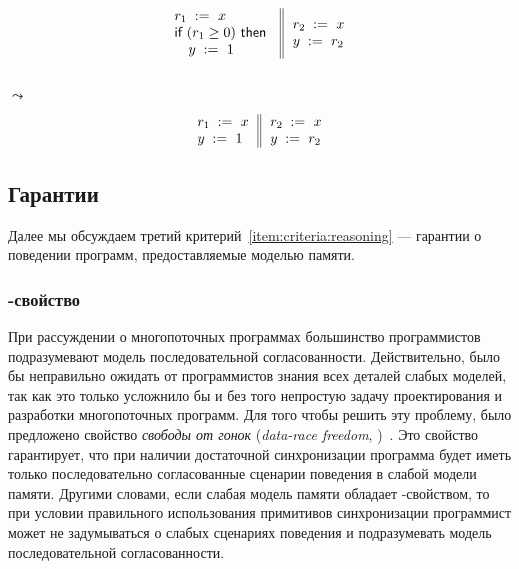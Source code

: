 {\footnotesize
\begin{minipage}{0.45\linewidth}
\begin{equation*}
\inarrII{
   \readInst{}{r_1}{x}             \\
   \kw{if} (r_1 \geq 0) ~\kw{then} \\
   \quad\writeInst{}{y}{1}         \\
}{
  \readInst{}{r_2}{x}               \\
  \writeInst{}{y}{r_2}              \\
}
\end{equation*}
\end{minipage}\hfill%
\begin{minipage}{0.05\linewidth}
\Large~\\ $\leadsto$
\end{minipage}\hfill%
\begin{minipage}{0.4\linewidth}
\begin{equation*}
\inarrII{
   \readInst{}{r_1}{x}             \\
   \writeInst{}{y}{1}              \\
}{
  \readInst{}{r_2}{x}               \\
  \writeInst{}{y}{r_2}              \\
}
\end{equation*}
\end{minipage}
}

\subsection{Гарантии}

Далее мы обсуждаем третий критерий~\ref{item:criteria:reasoning} ---
гарантии о поведении программ, предоставляемые моделью памяти.

\subsubsection{\DRF-свойство}
\label{sec:background:drf}

При рассуждении о многопоточных программах  
большинство программистов подразумевают 
модель последовательной согласованности. 
Действительно, было бы неправильно ожидать
от программистов знания всех деталей слабых моделей, 
так как это только усложнило бы и без того 
непростую задачу проектирования и разработки
многопоточных программ. 
Для того чтобы решить эту проблему, 
было предложено свойство \emph{свободы от гонок}
(\emph{data-race freedom}, \DRF)~\cite{Manson-al:POPL05}.
Это свойство гарантирует, что при наличии 
достаточной синхронизации программа будет иметь 
только последовательно согласованные сценарии поведения в слабой модели памяти. 
Другими словами, если слабая модель памяти обладает \DRF-свойством, 
то при условии правильного использования примитивов синхронизации
программист может не задумываться о слабых сценариях поведения 
и подразумевать модель последовательной согласованности.

